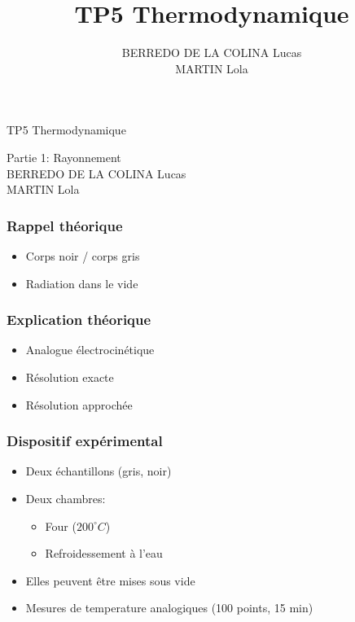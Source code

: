 \documentclass{beamer}
\title{TP5 Thermodynamique}
\author{BERREDO DE LA COLINA Lucas\\ MARTIN Lola}
\date{}
\begin{document}
\begin{frame}

\Huge{TP5 Thermodynamique}

\Large{Partie 1: Rayonnement}
\\[2em]
\large{BERREDO DE LA COLINA Lucas\\ MARTIN Lola}

\end{frame}





\begin{frame}
\frametitle{Rappel théorique}

\begin{itemize}
	\item{Corps noir / corps gris}
	\item{Radiation dans le vide}

\end{itemize}

\end{frame}





\begin{frame}
\frametitle{Explication théorique}

\begin{itemize}
	\item{Analogue électrocinétique}
	\item{Résolution exacte}
	\item{Résolution approchée}
	
\end{itemize}

\end{frame}





\begin{frame}
\frametitle{Dispositif expérimental}

\begin{itemize}
	\item{Deux échantillons (gris, noir)\newline}
	\item{Deux chambres:\newline
	\begin{itemize}
		\item{Four ($200^{\circ}C$)\newline}
		\item{Refroidessement à l'eau\newline}
	\end{itemize}}
	\item{Elles peuvent être mises sous vide\newline}
	\item{Mesures de temperature analogiques (100 points, 15 min)}
\end{itemize}
\end{frame}
\end{document}
